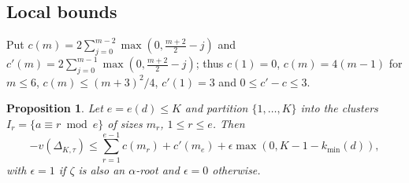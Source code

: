 \documentclass[11pt]{amsart}
\newtheorem{proposition}[theorem]{Proposition}
\theoremstyle{definition}
\theoremstyle{remark}
\numberwithin{equation}{section}
\begin{document}
\subsection{Local bounds}

Put $c(m)=2\sum_{j=0}^{m-2}\max(0,\tfrac{m+2}2-j)$ and $c'(m)=2\sum_{j=0}^{m-1}\max(0,\tfrac{m+2}2-j)$; thus
$c(1)=0$, $c(m)=4(m-1)$ for $m\le6$, $c(m)\le(m+3)^2/4$, $c'(1)=3$ and $0\le c'-c\le3$.

\begin{proposition}\label{prop:W}
Let $e=e(d)\le K$ and partition $\{1,\dots,K\}$ into the clusters $I_r=\{a\equiv r\bmod e\}$ of sizes $m_r$,
$1\le r\le e$. Then
\[
-v(\Delta_{K,\tau})\le\sum_{r=1}^{e-1}c(m_r)+c'(m_e)+\epsilon\max(0,K-1-k_{\min}(d)),
\]
with $\epsilon=1$ if $\zeta$ is also an $\alpha$-root and $\epsilon=0$ otherwise.
\end{proposition}
\end{document}
